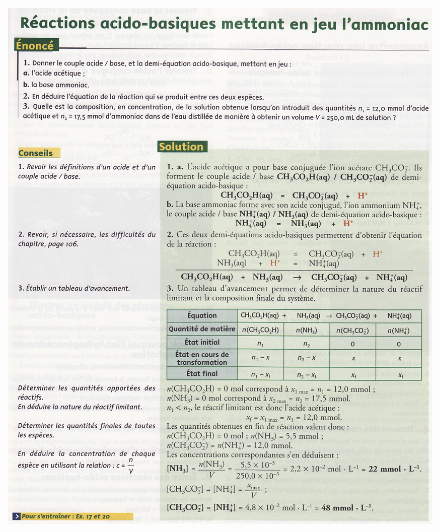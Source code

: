 \documentclass[11pt,a4paper]{article}
\begin{document}
\begin{figure}[h]
    \centering
    \includegraphics[width=\linewidth]{imgs/c3/xo2.jpg}
\end{figure}
\end{document}
